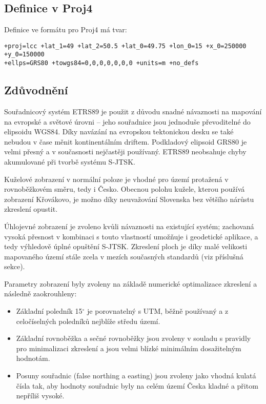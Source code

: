 \documentclass[a4paper]{article}
\newcommand{\dg}{^{\circ}}
\begin{document}
\subsection{Definice v Proj4}
Definice ve formátu pro Proj4 má tvar:
\begin{verbatim}
+proj=lcc +lat_1=49 +lat_2=50.5 +lat_0=49.75 +lon_0=15 +x_0=250000 +y_0=150000
+ellps=GRS80 +towgs84=0,0,0,0,0,0,0 +units=m +no_defs
\end{verbatim}

\subsection{Zdůvodnění}
Souřadnicový systém ETRS89 je použit z důvodu snadné návaznosti na mapování na evropské a světové úrovni -- jeho souřadnice jsou jednoduše převoditelné do elipsoidu WGS84. Díky navázání na evropskou tektonickou desku se také nebudou v čase měnit kontinentálním driftem. Podkladový elipsoid GRS80 je velmi přesný a v současnosti nejčastěji používaný. ETRS89 neobsahuje chyby akumulované při tvorbě systému S-JTSK.

Kuželové zobrazení v normální poloze je vhodné pro území protažená v rovnoběžkovém směru, tedy i Česko. Obecnou polohu kužele, kterou používá zobrazení Křovákovo, je možno díky neuvažování Slovenska bez většího nárůstu zkreslení opustit.

Úhlojevné zobrazení je zvoleno kvůli návaznosti na existující systém; zachovaná vysoká přesnost v kombinaci s touto vlastností umožňuje i geodetické aplikace, a tedy výhledově úplné opuštění S-JTSK. Zkreslení ploch je díky malé velikosti mapovaného území stále zcela v mezích současných standardů (viz příslušná sekce).

Parametry zobrazení byly zvoleny na základě numerické optimalizace zkreslení a následně zaokrouhleny:
\begin{itemize}
\item Základní poledník 15$\dg$ je porovnatelný s UTM, běžně používaný a z celočíselných poledníků nejblíže středu území.
\item Základní rovnoběžka a sečné rovnoběžky jsou zvoleny v souladu s pravidly pro minimalizaci zkreslení a jsou velmi blízké minimálním dosažitelným hodnotám.
\item Posuny souřadnic (false northing a easting) jsou zvoleny jako vhodná kulatá čísla tak, aby hodnoty souřadnic byly na celém území Česka kladné a přitom nepříliš vysoké.
\end{itemize}
\end{document}
